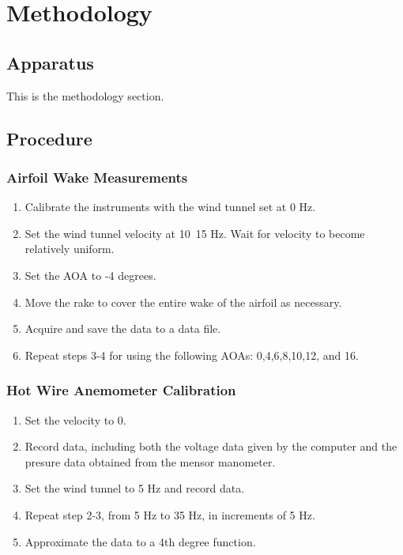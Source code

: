 \chapter{Methodology}
\label{cp:methodology}

\section{Apparatus}\label{sec:apparatus}
This is the methodology section.

\newpage
\section{Procedure}\label{sec:procedures}
\subsection{Airfoil Wake Measurements}

\begin{enumerate}
\item Calibrate the instruments with the wind tunnel set at 0 Hz.
\item Set the wind tunnel velocity at 10~15 Hz. Wait for velocity to become relatively uniform. 
\item Set the AOA to -4 degrees. 
\item Move the rake to cover the entire wake of the airfoil as necessary.
\item Acquire and save the data to a data file.
\item Repeat steps 3-4 for using the following AOAs: 0,4,6,8,10,12, and 16.
\end{enumerate}

\subsection{Hot Wire Anemometer Calibration}

\begin{enumerate}
\item Set the velocity to 0. \item Record data, including both the voltage data given by the computer and the presure data obtained from the mensor manometer.
\item Set the wind tunnel to 5 Hz and record data. 
\item Repeat step 2-3, from 5 Hz to 35 Hz, in increments of 5 Hz. 
\item Approximate the data to a 4th degree function. 
\end{enumerate}